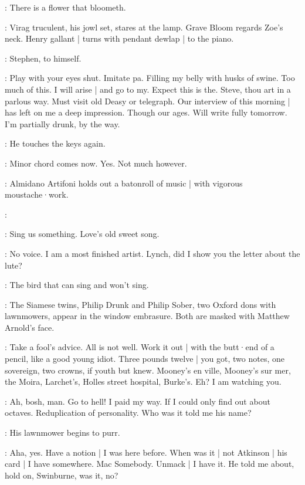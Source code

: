 \Henry:
There is a flower that bloometh.%

:
Virag truculent,
his jowl set,
stares at the lamp.
Grave Bloom regards Zoe's neck.
Henry gallant |
turns with pendant dewlap |
to the piano.

:
Stephen,
to himself.

\Stephen:
Play with your eyes shut.
Imitate pa.
Filling my belly with husks of swine.
Too much of this.
I will arise |
and go to my.
Expect this is the.
Steve,
thou art in a parlous way.
Must visit old Deasy or telegraph.
Our interview of this morning |
has left on me a deep impression.
Though our ages.
Will write fully tomorrow.
I'm partially drunk,
by the way.

:
He touches the keys again.

\Stephen:
Minor chord comes now.
Yes.
Not much however.

:
Almidano Artifoni holds out a batonroll of music |
with vigorous moustache·work.

\Artifoni:

\Florry[1]:
Sing us something.
Love's old sweet song.

\Stephen:
No voice.
I am a most finished artist.
Lynch,
did I show you the letter about the lute?

\Florry:
The bird that can sing and won't sing.

:
The Siamese twins,
Philip Drunk and Philip Sober,
two Oxford dons with lawnmowers,
appear in the window embrasure.
Both are masked with Matthew Arnold's face.

\PhilipSober[2]:
Take a fool's advice.
All is not well.
Work it out |
with the butt·end of a pencil,
like a good young idiot.
Three pounds twelve |
you got,
two notes,
one sovereign,
two crowns,
if youth but knew.
Mooney's en ville,
Mooney's sur mer,
the Moira,
Larchet's,
Holles street hospital,
Burke's.
Eh?
I am watching you.%

\PhilipDrunk[2]:
Ah,
bosh,
man.
Go to hell!
I paid my way.
If I could only find out about octaves.
Reduplication of personality.
Who was it told me his name?

:
His lawnmower begins to purr.

\PhilipDrunk:
Aha,
yes.
Have a notion |
I was here before.
When was it |
not Atkinson |
his card |
I have somewhere.
Mac Somebody.
Unmack |
I have it.
He told me about,
hold on,
Swinburne,
was it,
no?

